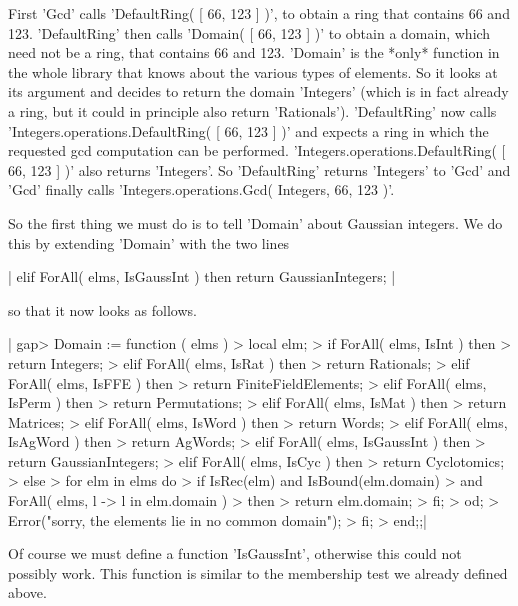 First 'Gcd'  calls 'DefaultRing( [ 66, 123 ]  )', to obtain  a ring  that
contains 66 and 123.  'DefaultRing' then calls 'Domain( [ 66, 123 ] )' to
obtain a domain,  which need  not be  a ring,  that contains 66  and 123.
'Domain' is the *only*  function in the  whole {\GAP} library  that knows
about the various  types  of  elements.  So it looks  at its argument and
decides to return the domain 'Integers' (which is in fact already a ring,
but  it could in principle  also  return 'Rationals').  'DefaultRing' now
calls 'Integers.operations.DefaultRing( [ 66, 123 ] )' and expects a ring
in   which   the   requested   gcd   computation   can    be   performed.
'Integers.operations.DefaultRing( [ 66, 123 ] )' also returns 'Integers'.
So  'DefaultRing' returns 'Integers'  to 'Gcd'  and 'Gcd'  finally  calls
'Integers.operations.Gcd( Integers, 66, 123 )'.

So  the  first thing  we must  do is  to  tell  'Domain'  about  Gaussian
integers.  We do this by extending 'Domain' with the two lines

|        elif ForAll( elms, IsGaussInt )  then
            return GaussianIntegers; |

so that it now looks as follows.

|    gap> Domain := function ( elms )
    >     local   elm;
    >     if   ForAll( elms, IsInt )  then
    >         return Integers;
    >     elif ForAll( elms, IsRat )  then
    >         return Rationals;
    >     elif ForAll( elms, IsFFE )  then
    >         return FiniteFieldElements;
    >     elif ForAll( elms, IsPerm )  then
    >         return Permutations;
    >     elif ForAll( elms, IsMat )  then
    >         return Matrices;
    >     elif ForAll( elms, IsWord )  then
    >         return Words;
    >     elif ForAll( elms, IsAgWord )  then
    >         return AgWords;
    >     elif ForAll( elms, IsGaussInt )  then
    >         return GaussianIntegers;
    >     elif ForAll( elms, IsCyc )  then
    >         return Cyclotomics;
    >     else
    >         for elm  in elms do
    >             if    IsRec(elm)  and IsBound(elm.domain)
    >               and ForAll( elms, l -> l in elm.domain )
    >             then
    >                 return elm.domain;
    >             fi;
    >         od;
    >         Error("sorry, the elements lie in no common domain");
    >     fi;
    > end;;|

Of course  we must define a  function 'IsGaussInt', otherwise this  could
not possibly work.  This  function is similar to  the membership test  we
already defined above.

